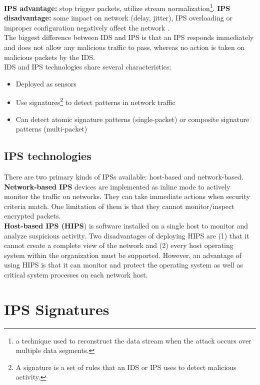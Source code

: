 \textbf{IPS advantage:} stop trigger packets, utilize stream normalization\footnote{a technique used to reconstruct the data stream when the attack occurs over multiple data segments.}. \textbf{IPS disadvantage:} some impact on network (delay, jitter), IPS overloading or improper configuration negatively affect the network .\\

The biggest difference between IDS and IPS is that an IPS responds immediately and does not allow any malicious traffic to pass, whereas no action is taken on malicious packets by the IDS.\\

IDS and IPS technologies share several characteristics:

\begin{itemize}
\item Deployed as sensors
\item Use signatures\footnote{A signature is a set of rules that an IDS or IPS uses to detect malicious activity.} to detect patterns in network traffic
\item Can detect atomic signature patterns (single-packet) or composite signature patterns (multi-packet)
\end{itemize}

\subsection{IPS technologies}

There are two primary kinds of IPSs available: host-based and network-based. \\

\textbf{Network-based IPS }devices are implemented as inline mode to actively monitor the traffic on networks. They can take immediate actions when security criteria match. One limitation of them is that they cannot monitor/inspect encrypted packets.\\

\textbf{Host-based IPS (HIPS}) is software installed on a single host to monitor and analyze suspicious activity. Two disadvantages of deploying HIPS are (1) that it cannot create a complete view of the network and (2) every host operating system within the organization must be supported. However, an advantage of using HIPS is that it can monitor and protect the operating system as well as critical system processes on each network host.

\section{IPS Signatures}

